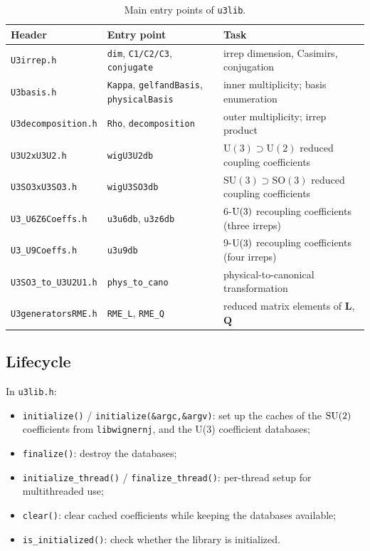 \documentclass[aps,onecolumn,10pt,superscriptaddress,floatfix,nofootinbib]{revtex4}
\begin{document}
\begin{table}[tp]
    \centering
    \begin{tabular}{p{3.2cm}p{5.8cm}p{6.2cm}}
    \hline\hline
         Header & Entry point & Task \\
        \hline
         \verb|U3irrep.h| & \verb|dim|, \verb|C1/C2/C3|, \verb|conjugate| & irrep dimension, Casimirs, conjugation \\
         \verb|U3basis.h| & \verb|Kappa|, \verb|gelfandBasis|, \verb|physicalBasis| & inner multiplicity; basis enumeration \\
         \verb|U3decomposition.h| & \verb|Rho|, \verb|decomposition| & outer multiplicity; irrep product  \\
         \verb|U3U2xU3U2.h| & \verb|wigU3U2db| & $\mathrm{U(3)}{\supset}\mathrm{U(2)}$ reduced coupling coefficients  \\
         \verb|U3SO3xU3SO3.h| & \verb|wigU3SO3db| & $\mathrm{SU(3)}{\supset}\mathrm{SO(3)}$ reduced coupling coefficients  \\
         \verb|U3_U6Z6Coeffs.h| & \verb|u3u6db|, \verb|u3z6db| & 6-$\rm U(3)$ recoupling coefficients (three irreps)  \\
         \verb|U3_U9Coeffs.h| & \verb|u3u9db| & 9-$\rm U(3)$ recoupling coefficients (four irreps)  \\
         \verb|U3SO3_to_U3U2U1.h| & \verb|phys_to_cano| & physical-to-canonical transformation \\
         \verb|U3generatorsRME.h| & \verb|RME_L|, \verb|RME_Q| & reduced matrix elements of $\mathbf{L}$, $\mathbf{Q}$ \\
    \hline\hline
    \end{tabular}
    \caption{Main entry points of \texttt{u3lib}.}
    \label{tab:main-funcs}
\end{table}

\subsection{Lifecycle}
In \verb|u3lib.h|:
\begin{itemize}
    \item \verb|initialize()| / \verb|initialize(&argc,&argv)|: set up the caches of the $\rm SU(2)$ coefficients from \texttt{libwignernj}, and the U(3) coefficient databases;
    \item \verb|finalize()|: destroy the databases;
    \item \verb|initialize_thread()| / \verb|finalize_thread()|: per-thread setup for multithreaded use;
    \item \verb|clear()|: clear cached coefficients while keeping the databases available;
    \item \verb|is_initialized()|: check whether the library is initialized.
\end{itemize}
\end{document}
